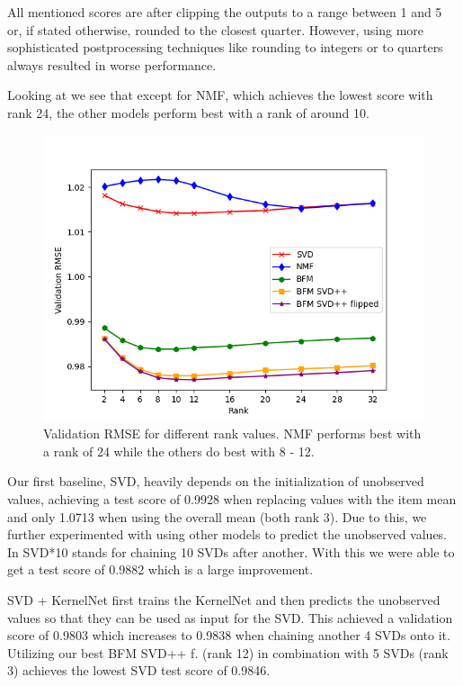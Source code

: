 \documentclass[10pt,conference,compsocconf]{IEEEtran}
\begin{document}
    All mentioned scores are after clipping the outputs to a range between 1 and 5 or, if stated otherwise, rounded to the closest quarter.
    However, using more sophisticated postprocessing techniques like rounding to integers or to quarters always resulted in worse performance.

    Looking at  we see that except for NMF, which achieves the lowest score with rank 24, the other models perform best with a rank of around 10.
    \begin{figure}
        \includegraphics[width=\columnwidth]{figures/rank.png}
        \caption{Validation RMSE for different rank values.
        NMF performs best with a rank of 24 while the others do best with 8 - 12.}
        \label{fig:rank}
    \end{figure}


    Our first baseline, SVD, heavily depends on the initialization of unobserved values, achieving a test score of 0.9928 when replacing values with the item mean and only 1.0713 when using the overall mean (both rank 3).
    Due to this, we further experimented with using other models to predict the unobserved values.
    In  SVD*10 stands for chaining 10 SVDs after another.
    With this we were able to get a test score of 0.9882 which is a large improvement.

    SVD + KernelNet first trains the KernelNet and then predicts the unobserved values so that they can be used as input for the SVD.
    This achieved a validation score of 0.9803 which increases to 0.9838 when chaining another 4 SVDs onto it.
    Utilizing our best BFM SVD++ f. (rank 12) in combination with 5 SVDs (rank 3) achieves the lowest SVD test score of 0.9846.
\end{document}
